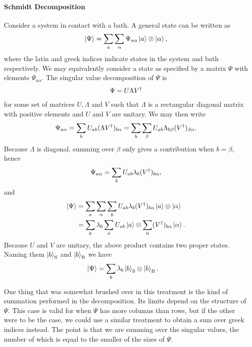 \paragraph{Schmidt Decomposition}
Consider a system in contact with a bath. A general state can be written as
\begin{align*}
	\ket{\Psi} = \sum\limits_{a}\sum\limits_{\alpha}\Psi_{a\alpha}\ket{a}\otimes\ket{\alpha},
\end{align*}
where the latin and greek indices indicate states in the system and bath respectively. We may equivalently consider a state as specified by a matrix $\Psi$ with elements $\Psi_{a\alpha}$. The singular value decomposition of $\Psi$ is
\begin{align*}
	\Psi = U\Lambda V^{\dagger}
\end{align*}
for some set of matrices $U, \Lambda$ and $V$ such that $\Lambda$ is a rectangular diagonal matrix with positive elements and $U$ and $V$ are unitary. We may then write
\begin{align*}
	\Psi_{a\alpha} = \sum\limits_{b}U_{ab}(\Lambda V^{\dagger})_{b\alpha} = \sum\limits_{b}\sum\limits_{\beta}U_{ab}\Lambda_{b\beta}(V^{\dagger})_{\beta\alpha}.
\end{align*}
Because $\Lambda$ is diagonal, summing over $\beta$ only gives a contribution when $b = \beta$, hence
\begin{align*}
	\Psi_{a\alpha} = \sum\limits_{b}U_{ab}\lambda_{b}(V^{\dagger})_{b\alpha},
\end{align*}
and
\begin{align*}
	\ket{\Psi} &= \sum\limits_{a}\sum\limits_{\alpha}\sum\limits_{b}U_{ab}\lambda_{b}(V^{\dagger})_{b\alpha}\ket{a}\otimes\ket{\alpha} \\
	           &= \sum\limits_{b}\lambda_{b}\sum\limits_{a}U_{ab}\ket{a}\otimes\sum\limits_{\alpha}(V^{\dagger})_{b\alpha}\ket{\alpha}.
\end{align*}
Because $U$ and $V$ are unitary, the above product contains two proper states. Naming them $\ket{b}_{\text{S}}$ and $\ket{b}_{\text{B}}$ we have
\begin{align*}
	\ket{\Psi} &= \sum\limits_{b}\lambda_{b}\ket{b}_{\text{S}}\otimes\ket{b}_{\text{B}}.
\end{align*}

One thing that was somewhat brushed over in this treatment is the kind of summation performed in the decomposition. Its limits depend on the structure of $\Psi$. This case is valid for when $\Psi$ has more columns than rows, but if the other were to be the case, we could use a similar treatment to obtain a sum over greek indices instead. The point is that we are summing over the singular values, the number of which is equal to the smaller of the sizes of $\Psi$.

